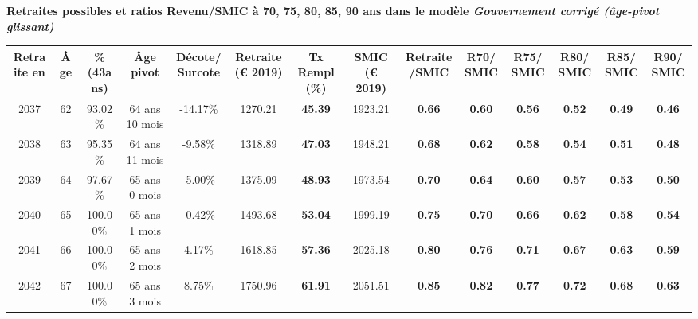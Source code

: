  \vspace{0.1cm} 
{\bf \noindent Retraites possibles et ratios Revenu/SMIC à 70, 75, 80, 85, 90 ans dans le modèle \emph{Gouvernement corrigé (âge-pivot glissant)}}  
 
\begin{adjustbox}{max width=\textwidth} 
\begin{tabular}[htb]{|c|c||c|c|c||c|c||c|c||c|c|c|c|c|} 
\hline 
 Retraite en &  Âge &  \%(43ans) &  Âge pivot &  Décote/Surcote &  Retraite (\euro{} 2019) &  Tx Rempl(\%) &  SMIC (\euro{} 2019) &  Retraite/SMIC &  R70/SMIC &  R75/SMIC &  R80/SMIC &  R85/SMIC &  R90/SMIC \\ 
\hline \hline 
 2037 &  62 &  93.02\% &  64 ans 10 mois &  -14.17\% &  1270.21 &  {\bf 45.39} &  1923.21 &  {\bf {\color{red} 0.66}} &  {\bf {\color{red} 0.60}} &  {\bf {\color{red} 0.56}} &  {\bf {\color{red} 0.52}} &  {\bf {\color{red} 0.49}} &  {\bf {\color{red} 0.46}} \\ 
\hline 
 2038 &  63 &  95.35\% &  64 ans 11 mois &  -9.58\% &  1318.89 &  {\bf 47.03} &  1948.21 &  {\bf {\color{red} 0.68}} &  {\bf {\color{red} 0.62}} &  {\bf {\color{red} 0.58}} &  {\bf {\color{red} 0.54}} &  {\bf {\color{red} 0.51}} &  {\bf {\color{red} 0.48}} \\ 
\hline 
 2039 &  64 &  97.67\% &  65 ans 0 mois &  -5.00\% &  1375.09 &  {\bf 48.93} &  1973.54 &  {\bf {\color{red} 0.70}} &  {\bf {\color{red} 0.64}} &  {\bf {\color{red} 0.60}} &  {\bf {\color{red} 0.57}} &  {\bf {\color{red} 0.53}} &  {\bf {\color{red} 0.50}} \\ 
\hline 
 2040 &  65 &  100.00\% &  65 ans 1 mois &  -0.42\% &  1493.68 &  {\bf 53.04} &  1999.19 &  {\bf {\color{red} 0.75}} &  {\bf {\color{red} 0.70}} &  {\bf {\color{red} 0.66}} &  {\bf {\color{red} 0.62}} &  {\bf {\color{red} 0.58}} &  {\bf {\color{red} 0.54}} \\ 
\hline 
 2041 &  66 &  100.00\% &  65 ans 2 mois &  4.17\% &  1618.85 &  {\bf 57.36} &  2025.18 &  {\bf {\color{red} 0.80}} &  {\bf {\color{red} 0.76}} &  {\bf {\color{red} 0.71}} &  {\bf {\color{red} 0.67}} &  {\bf {\color{red} 0.63}} &  {\bf {\color{red} 0.59}} \\ 
\hline 
 2042 &  67 &  100.00\% &  65 ans 3 mois &  8.75\% &  1750.96 &  {\bf 61.91} &  2051.51 &  {\bf {\color{red} 0.85}} &  {\bf {\color{red} 0.82}} &  {\bf {\color{red} 0.77}} &  {\bf {\color{red} 0.72}} &  {\bf {\color{red} 0.68}} &  {\bf {\color{red} 0.63}} \\ 
\hline 
\hline 
\end{tabular} 
\end{adjustbox} 
 
